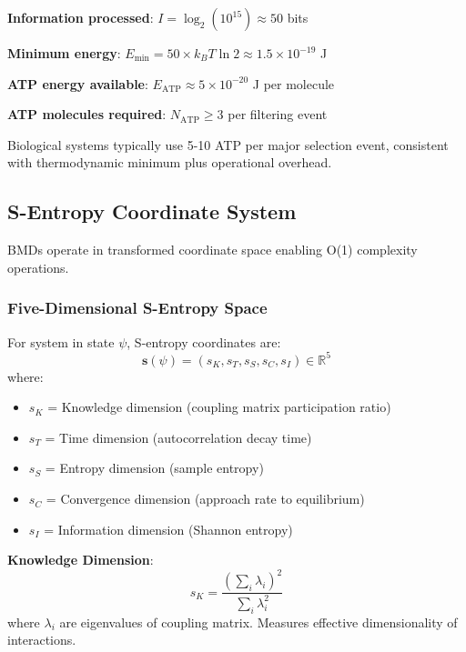 \documentclass[11pt,onecolumn]{article}
\begin{document}
\textbf{Information processed}: $I = \log_2(10^{15}) \approx 50$ bits

\textbf{Minimum energy}: $E_{\text{min}} = 50 \times k_B T \ln 2 \approx 1.5 \times 10^{-19}$ J

\textbf{ATP energy available}: $E_{\text{ATP}} \approx 5 \times 10^{-20}$ J per molecule

\textbf{ATP molecules required}: $N_{\text{ATP}} \geq 3$ per filtering event

Biological systems typically use 5-10 ATP per major selection event, consistent with thermodynamic minimum plus operational overhead.

\subsection{S-Entropy Coordinate System}

BMDs operate in transformed coordinate space enabling O(1) complexity operations.

\subsubsection{Five-Dimensional S-Entropy Space}

\begin{definition}
For system in state $\psi$, S-entropy coordinates are:
\begin{equation}
\mathbf{s}(\psi) = (s_K, s_T, s_S, s_C, s_I) \in \mathbb{R}^5
\end{equation}
where:
\begin{itemize}
\item $s_K$ = Knowledge dimension (coupling matrix participation ratio)
\item $s_T$ = Time dimension (autocorrelation decay time)  
\item $s_S$ = Entropy dimension (sample entropy)
\item $s_C$ = Convergence dimension (approach rate to equilibrium)
\item $s_I$ = Information dimension (Shannon entropy)
\end{itemize}
\end{definition}

\textbf{Knowledge Dimension}:
\begin{equation}
s_K = \frac{(\sum_i \lambda_i)^2}{\sum_i \lambda_i^2}
\end{equation}
where $\lambda_i$ are eigenvalues of coupling matrix. Measures effective dimensionality of interactions.
\end{document}
